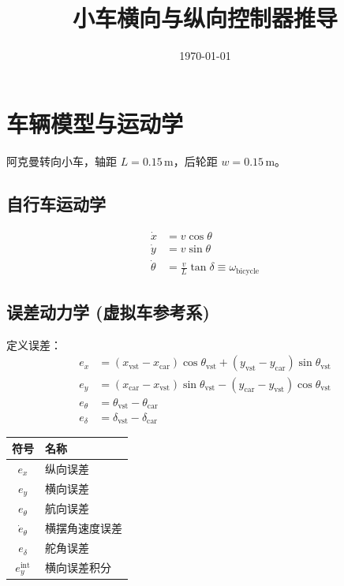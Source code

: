 \documentclass[11pt,a4paper]{article}
\title{小车横向与纵向控制器推导}
\author{}
\date{\today}
\begin{document}
\maketitle

\section{车辆模型与运动学}

阿克曼转向小车，轴距 $L = 0.15\,\text{m}$，后轮距 $w = 0.15\,\text{m}$。

\subsection{自行车运动学}

\begin{align}
\dot{x}   &= v \cos\theta \\
\dot{y}   &= v \sin\theta \\
\dot\theta &= \frac{v}{L}\tan\delta \equiv \omega_{\text{bicycle}} \label{eq:bicycle}
\end{align}

\subsection{误差动力学 (虚拟车参考系)}

定义误差：
\begin{align}
e_x &= (x_{\text{vst}} - x_{\text{car}})\cos\theta_{\text{vst}} + (y_{\text{vst}} - y_{\text{car}})\sin\theta_{\text{vst}} \label{eq:ex}\\
e_y &= (x_{\text{car}} - x_{\text{vst}})\sin\theta_{\text{vst}} - (y_{\text{car}} - y_{\text{vst}})\cos\theta_{\text{vst}} \label{eq:ey}\\
e_\theta &= \theta_{\text{vst}} - \theta_{\text{car}} \\
e_\delta &= \delta_{\text{vst}} - \delta_{\text{car}}
\end{align}

\begin{center}
\begin{tabular}{c|l}
\toprule
符号 & 名称 \\
\midrule
$e_x$ & 纵向误差 \\
$e_y$ & 横向误差 \\
$e_\theta$ & 航向误差 \\
$\dot{e}_\theta$ & 横摆角速度误差 \\
$e_\delta$ & 舵角误差 \\
$e_y^{\text{int}}$ & 横向误差积分 \\
\bottomrule
\end{tabular}
\end{center}
\end{document}
